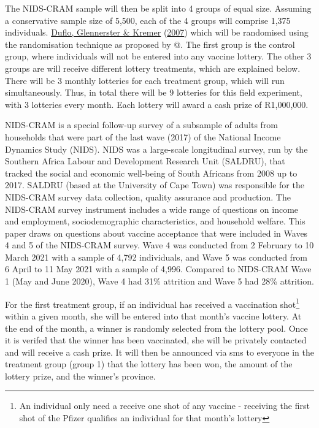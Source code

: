 \documentclass[11pt,preprint, authoryear]{elsarticle}
\numberwithin{equation}{section}
\numberwithin{figure}{section}
\numberwithin{table}{section}
\let\rmarkdownfootnote\footnote%
\def\footnote{\protect\rmarkdownfootnote}
\begin{document}
The NIDS-CRAM sample will then be split into 4 groups of equal size.
Assuming a conservative sample size of 5,500, each of the 4 groups will
comprise 1,375 individuals. \protect\hyperlink{ref-random}{Duflo,
Glennerster \& Kremer} (\protect\hyperlink{ref-random}{2007}) which will
be randomised using the randomisation technique as proposed by @. The
first group is the control group, where individuals will not be entered
into any vaccine lottery. The other 3 groups are will receive different
lottery treatments, which are explained below. There will be 3 monthly
lotteries for each treatment group, which will run simultaneously. Thus,
in total there will be 9 lotteries for this field experiment, with 3
lotteries every month. Each lottery will award a cash prize of
R1,000,000.

NIDS-CRAM is a special follow-up survey of a subsample of adults from
households that were part of the last wave (2017) of the National Income
Dynamics Study (NIDS). NIDS was a large-scale longitudinal survey, run
by the Southern Africa Labour and Development Research Unit (SALDRU),
that tracked the social and economic well-being of South Africans from
2008 up to 2017. SALDRU (based at the University of Cape Town) was
responsible for the NIDS-CRAM survey data collection, quality assurance
and production. The NIDS-CRAM survey instrument includes a wide range of
questions on income and employment, sociodemographic characteristics,
and household welfare. This paper draws on questions about vaccine
acceptance that were included in Waves 4 and 5 of the NIDS-CRAM survey.
Wave 4 was conducted from 2 February to 10 March 2021 with a sample of
4,792 individuals, and Wave 5 was conducted from 6 April to 11 May 2021
with a sample of 4,996. Compared to NIDS-CRAM Wave 1 (May and June
2020), Wave 4 had 31\% attrition and Wave 5 had 28\% attrition.

For the first treatment group, if an individual has received a
vaccination shot\footnote{An individual only need a receive one shot of
  any vaccine - receiving the first shot of the Pfizer qualifies an
  individual for that month's lottery} within a given month, she will be
entered into that month's vaccine lottery. At the end of the month, a
winner is randomly selected from the lottery pool. Once it is verifed
that the winner has been vaccinated, she will be privately contacted and
will receive a cash prize. It will then be announced via sms to everyone
in the treatment group (group 1) that the lottery has been won, the
amount of the lottery prize, and the winner's province.
\end{document}
